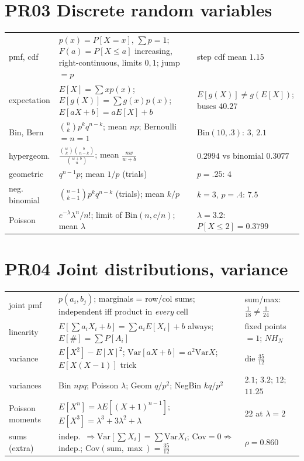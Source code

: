 \documentclass[9pt]{article}
\begin{document}
\section*{PR03 Discrete random variables}
\begin{tabular}{@{}p{2.9cm}p{8.4cm}p{6.1cm}@{}}
\toprule
pmf, cdf & $p(x)=P[X=x]$, $\sum p=1$; $F(a)=P[X\le a]$ increasing, right-continuous, limits $0,1$; jump $=p$ & step cdf mean $1.15$\\
expectation & $E[X]=\sum xp(x)$; $E[g(X)]=\sum g(x)p(x)$; $E[aX+b]=aE[X]+b$ & $E[g(X)]\ne g(E[X])$; buses $40.27$\\
Bin, Bern & $\binom nkp^kq^{n-k}$; mean $np$; Bernoulli $=n{=}1$ & Bin$(10,.3)$: $3$, $2.1$\\
hypergeom. & $\tfrac{\binom wk\binom b{n-k}}{\binom{w+b}n}$; mean $\tfrac{nw}{w+b}$ & $0.2994$ vs binomial $0.3077$\\
geometric & $q^{n-1}p$; mean $1/p$ (trials) & $p=.25$: $4$\\
neg. binomial & $\binom{n-1}{k-1}p^kq^{n-k}$ (trials); mean $k/p$ & $k{=}3$, $p{=}.4$: $7.5$\\
Poisson & $e^{-\lambda}\lambda^n/n!$; limit of Bin$(n,c/n)$; mean $\lambda$ & $\lambda=3.2$: $P[X\le2]=0.3799$\\
\bottomrule
\end{tabular}

\section*{PR04 Joint distributions, variance}
\begin{tabular}{@{}p{2.9cm}p{8.4cm}p{6.1cm}@{}}
\toprule
joint pmf & $p(a_i,b_j)$; marginals = row/col sums; independent iff product in \emph{every} cell & sum/max: $\tfrac1{18}\ne\tfrac1{24}$\\
linearity & $E[\sum a_iX_i+b]=\sum a_iE[X_i]+b$ always; $E[\#]=\sum P[A_i]$ & fixed points $=1$; $NH_N$\\
variance & $E[X^2]-E[X]^2$; $\mathrm{Var}[aX+b]=a^2\mathrm{Var}X$; $E[X(X-1)]$ trick & die $\tfrac{35}{12}$\\
variances & Bin $npq$; Poisson $\lambda$; Geom $q/p^2$; NegBin $kq/p^2$ & $2.1$; $3.2$; $12$; $11.25$\\
Poisson moments & $E[X^n]=\lambda E[(X+1)^{n-1}]$; $E[X^3]=\lambda^3+3\lambda^2+\lambda$ & $22$ at $\lambda=2$\\
sums (extra) & indep.\ $\Rightarrow\mathrm{Var}[\sum X_i]=\sum\mathrm{Var}X_i$; $\mathrm{Cov}=0\not\Rightarrow$ indep.; $\mathrm{Cov}(\text{sum},\max)=\tfrac{35}{12}$ & $\rho=0.860$\\
\bottomrule
\end{tabular}
\end{document}
